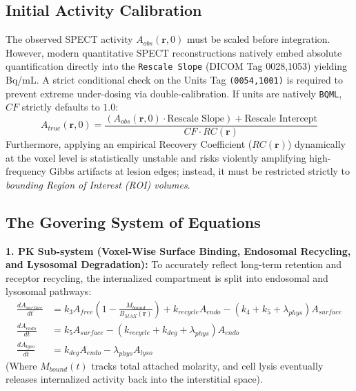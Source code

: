 \documentclass[11pt,a4paper]{article}
\begin{document}
\subsection{Initial Activity Calibration}
The observed SPECT activity $A_{obs}(\mathbf{r}, 0)$ must be scaled before integration. However, modern quantitative SPECT reconstructions natively embed absolute quantification directly into the \texttt{Rescale Slope} (DICOM Tag 0028,1053) yielding Bq/mL. A strict conditional check on the Units Tag \texttt{(0054,1001)} is required to prevent extreme under-dosing via double-calibration. If units are natively \texttt{BQML}, $CF$ strictly defaults to $1.0$:
\begin{equation}
    A_{true}(\mathbf{r}, 0) = \frac{\left( A_{obs}(\mathbf{r}, 0) \cdot \text{Rescale Slope} \right) + \text{Rescale Intercept}}{CF \cdot RC(\mathbf{r})}
\end{equation}
Furthermore, applying an empirical Recovery Coefficient ($RC(\mathbf{r})$) dynamically at the voxel level is statistically unstable and risks violently amplifying high-frequency Gibbs artifacts at lesion edges; instead, it must be restricted strictly to \textit{bounding Region of Interest (ROI) volumes}.

\subsection{The Govering System of Equations}
\textbf{1. PK Sub-system (Voxel-Wise Surface Binding, Endosomal Recycling, and Lysosomal Degradation):}
To accurately reflect long-term retention and receptor recycling, the internalized compartment is split into endosomal and lysosomal pathways:
\begin{align}
    \frac{dA_{surface}}{dt} &= k_3 A_{free} \left( 1 - \frac{M_{bound}}{B_{MAX}(\mathbf{r})} \right) + k_{recycle} A_{endo} - (k_4 + k_5 + \lambda_{phys}) A_{surface} \\
    \frac{dA_{endo}}{dt} &= k_5 A_{surface} - (k_{recycle} + k_{deg} + \lambda_{phys}) A_{endo} \\
    \frac{dA_{lyso}}{dt} &= k_{deg} A_{endo} - \lambda_{phys} A_{lyso}
\end{align}
(Where $M_{bound}(t)$ tracks total attached molarity, and cell lysis eventually releases internalized activity back into the interstitial space).
\end{document}
